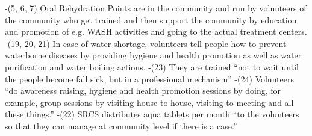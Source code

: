 -(5, 6, 7) Oral Rehydration Points are in the community and run by volunteers of the community who get trained and then support the community by education and promotion of e.g. WASH activities and going to the actual treatment centers.
-(19, 20, 21) In case of water shortage, volunteers tell people how to prevent waterborne diseases by providing hygiene and health promotion as well as water purification and water boiling actions.
-(23) They are trained “not to wait until the people become fall sick, but in a professional mechanism”
-(24) Volunteers “do awareness raising, hygiene and health promotion sessions by doing, for example, group sessions by visiting house to house, visiting to meeting and all these things.”
-(22) SRCS distributes aqua tablets per month “to the volunteers so that they can manage at community level if there is a case.”

